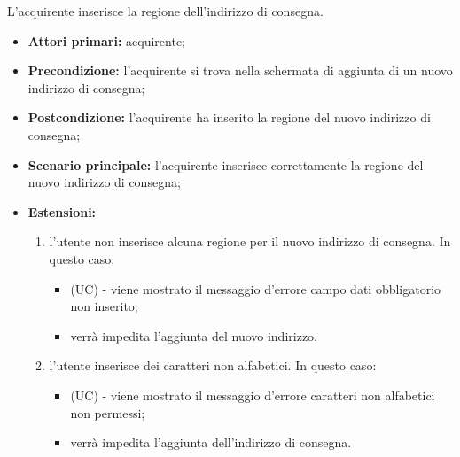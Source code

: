 L'acquirente inserisce la regione dell'indirizzo di consegna.
\begin{itemize}
    \item \textbf{Attori primari:} acquirente;
    \item \textbf{Precondizione:} l'acquirente si trova nella schermata di aggiunta di un nuovo indirizzo di consegna;
    \item \textbf{Postcondizione:} l'acquirente ha inserito la regione del nuovo indirizzo di consegna;
    \item \textbf{Scenario principale:} l'acquirente inserisce correttamente la regione del nuovo indirizzo di consegna;
    \item \textbf{Estensioni:}
    \begin{enumerate}[label=\lett]
        \item l'utente non inserisce alcuna regione per il nuovo indirizzo di consegna. In questo caso:
        \begin{itemize}
            \item (UC) - viene mostrato il messaggio d'errore campo dati obbligatorio non inserito;
            \item verrà impedita l'aggiunta del nuovo indirizzo.
        \end{itemize}
        \item l'utente inserisce dei caratteri non alfabetici. In questo caso:
        \begin{itemize}
            \item (UC) - viene mostrato il messaggio d'errore caratteri non alfabetici non permessi;
            \item verrà impedita l'aggiunta dell'indirizzo di consegna.
        \end{itemize}
    \end{enumerate}
\end{itemize}

